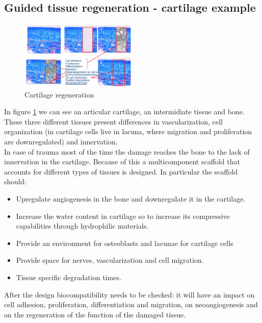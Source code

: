 	\subsection{Guided tissue regeneration - cartilage example}

		\begin{figure}[ht]
			\centering
			\includegraphics[width=0.5\textwidth]{cartilage.png}
			\caption{Cartilage regeneration}
			\label{fig:cartilage}
		\end{figure}

	In figure \ref{fig:cartilage} we can see an articular cartilage, an intermidiate tissue and bone.
	These three different tissues present differences in vascularization, cell organization (in cartilage cells live in lacuna, where migration and proliferation are downregulated) and innervation.\\
	In case of trauma most of the time the damage reaches the bone to the lack of innervation in the cartilage.
	Because of this a multicomponent scaffold that accounts for different types of tissues is designed.
	In particular the scaffold should:

	\begin{multicols}{2}
		\begin{itemize}
			\item Upregulate angiogenesis in the bone and downregulate it in the cartilage.
			\item Increase the water content in cartilage so to increase its compressive capabilities through hydrophilic materials.
			\item Provide an environment for osteoblasts and lacunae for cartilage cells
			\item Provide space for nerves, vascularization and cell migration.
			\item Tissue specific degradation times.
		\end{itemize}
	\end{multicols}

	After the design biocompatibility needs to be checked: it will have an impact on cell adhesion, proliferation, differentiation and migration, on neoangiogenesis and on the regeneration of the function of the damaged tissue.

